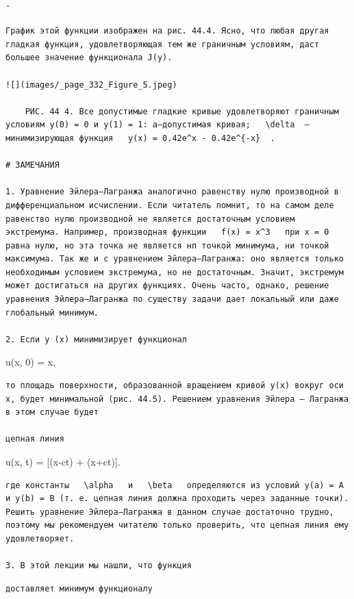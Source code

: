 \documentclass[
  ukrainian,
]{article}
\begin{document}
\begin{verbatim}
.

График этой функции изображен на рис. 44.4. Ясно, что любая другая гладкая функция, удовлетворяющая тем же граничным условиям, даст большее значение функционала J(y).

![](images/_page_332_Figure_5.jpeg)

    РИС. 44 4. Все допустимые гладкие кривые удовлетворяют граничным условиям y(0) = 0 и y(1) = 1: a—допустимая кривая;   \delta  —минимизирующая функция   y(x) = 0.42e^x - 0.42e^{-x}  .

# ЗАМЕЧАНИЯ

1. Уравнение Эйлера—Лагранжа аналогично равенству нулю производной в дифференциальном исчислении. Если читатель помнит, то на самом деле равенство нулю производной не является достаточным условием экстремума. Например, производная функции   f(x) = x^3   при x = 0 равна нулю, но эта точка не является нп точкой минимума, ни точкой максимума. Так же и с уравнением Эйлера—Лагранжа: оно является только необходимым условием экстремума, но не достаточным. Значит, экстремум может достигаться на других функциях. Очень часто, однако, решение уравнения Эйлера—Лагранжа по существу задачи дает локальный или даже глобальный минимум.

2. Если у (х) минимизирует функционал
\end{verbatim}

u(x, 0) = \sin x,

\begin{verbatim}
то площадь поверхности, образованной вращением кривой y(x) вокруг оси x, будет минимальной (рис. 44.5). Решением уравнения Эйлера — Лагранжа в этом случае будет

цепная линия
\end{verbatim}

u(x, t) =  {[}\sin(x-ct) + \sin(x+ct){]}.

\begin{verbatim}
где константы   \alpha   и   \beta   определяются из условий y(a) = A и y(b) = B (т. е. цепная линия должна проходить через заданные точки). Решить уравнение Эйлера—Лагранжа в данном случае достаточно трудно, поэтому мы рекомендуем читателю только проверить, что цепная линия ему удовлетворяет.

3. В этой лекции мы нашли, что функция
\end{verbatim}


\begin{verbatim}
доставляет минимум функционалу
\end{verbatim}
\end{document}
